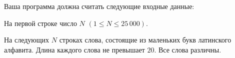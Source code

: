 Ваша программа должна считать следующие входные данные:

\begin{shortitems}
  \item На первой строке число $N$ $(1 \leqslant N \leqslant 25\,000)$.
  \item На следующих $N$ строках слова, состоящие из маленьких
        букв латинского алфавита.
        Длина каждого слова не превышает $20$. 
        Все слова различны. 
\end{shortitems}

